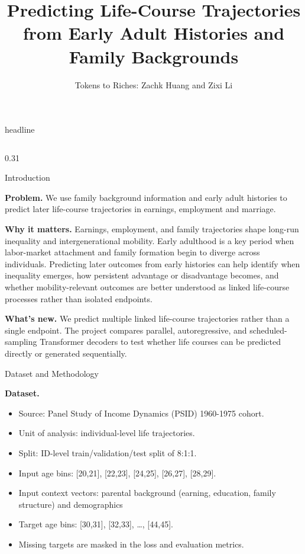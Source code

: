 \documentclass[final]{beamer}
\title{Predicting Life-Course Trajectories from Early Adult Histories and Family Backgrounds}
\author{Tokens to Riches: Zachk Huang and Zixi Li}
\institute{CSCI 1470 Deep Learning}
\date{}
\newcommand{\posterblock}[2]{
  \begin{block}{#1}
  #2
  \end{block}
}
\begin{document}
\begin{frame}[t]

\begin{beamercolorbox}[wd=\paperwidth, sep=1.2cm, center]{headline}
  {\Huge \bfseries \inserttitle \par}
  \vspace{0.4cm}
  {\Large \insertauthor \par}
  \vspace{0.2cm}
  {\large \insertinstitute \par}
\end{beamercolorbox}

\vspace{0.4cm}

\begin{columns}[t,totalwidth=\textwidth]

\begin{column}{0.31\textwidth}

\posterblock{Introduction}{
\textbf{Problem.} We use family background information and early adult histories to predict later life-course trajectories in earnings, employment and marriage.


\vspace{0.4em}
\textbf{Why it matters.} Earnings, employment, and family trajectories shape long-run inequality and intergenerational mobility. Early adulthood is a key period when labor-market attachment and family formation begin to diverge across individuals. Predicting later outcomes from early histories can help identify when inequality emerges, how persistent advantage or disadvantage becomes, and whether mobility-relevant outcomes are better understood as linked life-course processes rather than isolated endpoints.

\vspace{0.4em}
\textbf{What's new.} We predict multiple linked life-course trajectories rather than a single endpoint. The project compares parallel, autoregressive, and scheduled-sampling Transformer decoders to test whether life courses can be predicted directly or generated sequentially.
}

\posterblock{Dataset and Methodology}{
\textbf{Dataset.}
\begin{itemize}
  \item Source: Panel Study of Income Dynamics (PSID) 1960-1975 cohort.
  \item Unit of analysis: individual-level life trajectories.
  \item Split: ID-level train/validation/test split of 8:1:1.
  \item Input age bins: [20,21], [22,23], [24,25], [26,27], [28,29].
  \item Input context vectors: parental background (earning, education, family structure) and demographics
  \item Target age bins: [30,31], [32,33], \ldots, [44,45].
  \item Missing targets are masked in the loss and evaluation metrics.
\end{itemize}

}
\end{column}
\end{columns}
\end{frame}
\end{document}
